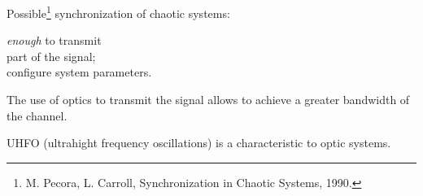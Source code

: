 


Possible\footnote{
    M. Pecora, L. Carroll, Synchronization in Chaotic Systems, 1990.
}  synchronization of chaotic systems:

\begin{minipage}{0.65\textwidth}
        \textit{enough} to transmit\\
        \phantom{python} part of the signal;\\
        \phantom{python} configure system parameters. 
\end{minipage}
\hfill
\begin{minipage}{0.3\textwidth}
    \begin{center}
    \end{center}
\end{minipage}


\phantom{42}

The use of optics to transmit the signal allows to achieve a greater bandwidth of the channel. 

\phantom{42}

UHFO (ultrahight frequency oscillations) is a characteristic to optic systems.

